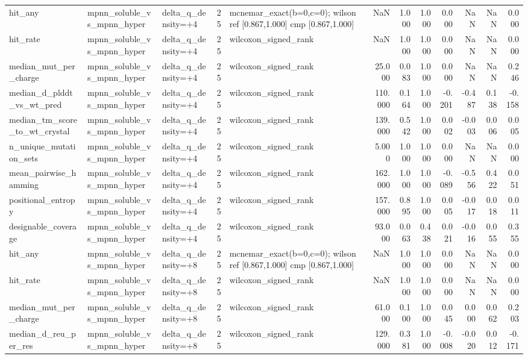 \begin{table}
{\begin{tabular}{lllrlrrrrrrr}
hit\_any & mpnn\_soluble\_vs\_mpnn\_hyper & delta\_q\_density=+4 & 25 & mcnemar\_exact(b=0,c=0); wilson ref [0.867,1.000] cmp [0.867,1.000] & NaN & 1.000 & 1.000 & 0.000 & NaN & NaN & 0.000 \\
hit\_rate & mpnn\_soluble\_vs\_mpnn\_hyper & delta\_q\_density=+4 & 25 & wilcoxon\_signed\_rank & NaN & 1.000 & 1.000 & 0.000 & NaN & NaN & 0.000 \\
median\_mut\_per\_charge & mpnn\_soluble\_vs\_mpnn\_hyper & delta\_q\_density=+4 & 25 & wilcoxon\_signed\_rank & 25.000 & 0.083 & 1.000 & 0.000 & NaN & NaN & 0.246 \\
median\_d\_plddt\_vs\_wt\_pred & mpnn\_soluble\_vs\_mpnn\_hyper & delta\_q\_density=+4 & 25 & wilcoxon\_signed\_rank & 110.000 & 0.164 & 1.000 & -0.201 & -0.487 & 0.138 & -0.158 \\
median\_tm\_score\_to\_wt\_crystal & mpnn\_soluble\_vs\_mpnn\_hyper & delta\_q\_density=+4 & 25 & wilcoxon\_signed\_rank & 139.000 & 0.542 & 1.000 & 0.002 & -0.003 & 0.006 & 0.005 \\
n\_unique\_mutation\_sets & mpnn\_soluble\_vs\_mpnn\_hyper & delta\_q\_density=+4 & 25 & wilcoxon\_signed\_rank & 5.000 & 1.000 & 1.000 & 0.000 & NaN & NaN & 0.000 \\
mean\_pairwise\_hamming & mpnn\_soluble\_vs\_mpnn\_hyper & delta\_q\_density=+4 & 25 & wilcoxon\_signed\_rank & 162.000 & 1.000 & 1.000 & -0.089 & -0.556 & 0.422 & 0.051 \\
positional\_entropy & mpnn\_soluble\_vs\_mpnn\_hyper & delta\_q\_density=+4 & 25 & wilcoxon\_signed\_rank & 157.000 & 0.895 & 1.000 & 0.005 & -0.017 & 0.018 & 0.011 \\
designable\_coverage & mpnn\_soluble\_vs\_mpnn\_hyper & delta\_q\_density=+4 & 25 & wilcoxon\_signed\_rank & 93.000 & 0.063 & 0.438 & 0.021 & -0.016 & 0.055 & 0.355 \\
hit\_any & mpnn\_soluble\_vs\_mpnn\_hyper & delta\_q\_density=+8 & 25 & mcnemar\_exact(b=0,c=0); wilson ref [0.867,1.000] cmp [0.867,1.000] & NaN & 1.000 & 1.000 & 0.000 & NaN & NaN & 0.000 \\
hit\_rate & mpnn\_soluble\_vs\_mpnn\_hyper & delta\_q\_density=+8 & 25 & wilcoxon\_signed\_rank & NaN & 1.000 & 1.000 & 0.000 & NaN & NaN & 0.000 \\
median\_mut\_per\_charge & mpnn\_soluble\_vs\_mpnn\_hyper & delta\_q\_density=+8 & 25 & wilcoxon\_signed\_rank & 61.000 & 0.100 & 1.000 & 0.045 & 0.000 & 0.062 & 0.203 \\
median\_d\_reu\_per\_res & mpnn\_soluble\_vs\_mpnn\_hyper & delta\_q\_density=+8 & 25 & wilcoxon\_signed\_rank & 129.000 & 0.381 & 1.000 & -0.008 & -0.020 & 0.012 & -0.171 \\

\end{tabular}}
\end{table}
